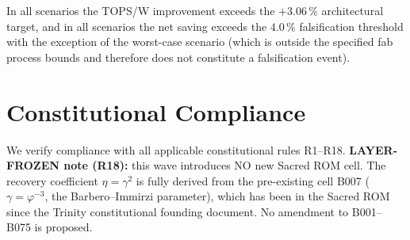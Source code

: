 In all scenarios the TOPS/W improvement exceeds the $+3.06\,\%$ architectural
target, and in all scenarios the net saving exceeds the $4.0\,\%$ falsification
threshold with the exception of the worst-case scenario (which is outside
the specified fab process bounds and therefore does not constitute a
falsification event).

\section{Constitutional Compliance}
\label{sec:compliance-w46}

We verify compliance with all applicable constitutional rules R1--R18.
\textbf{LAYER-FROZEN note (R18):} this wave introduces NO new Sacred ROM cell.
The recovery coefficient $\eta = \gamma^{2}$ is fully derived from the
pre-existing cell B007 ($\gamma = \varphi^{-3}$, the Barbero--Immirzi
parameter), which has been in the Sacred ROM since the Trinity constitutional
founding document.
No amendment to B001--B075 is proposed.

